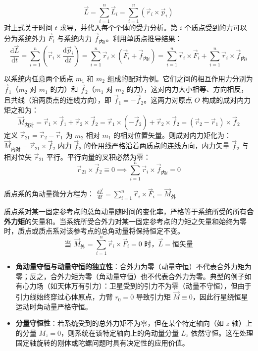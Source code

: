 \[
\vec{L} = \sum_{i=1}^{n} \vec{L}_i = \sum_{i=1}^{n} (\vec{r}_i \times \vec{p}_i)
\]
对上式关于时间 $t$ 求导，并代入每个个体的受力分析。第 $i$ 个质点受到的力可以分为系统外力 $\vec{F}_i$ 与系统内力 $\vec{f}_{\text{内}i}$。利用单质点推导结果：
\[
\frac{\mathrm{d}\vec{L}}{\mathrm{d}t} = \sum_{i=1}^{n} \left( \vec{r}_i \times \frac{\mathrm{d}\vec{p}_i}{\mathrm{d}t} \right) = \sum_{i=1}^{n} \vec{r}_i \times (\vec{F}_i + \vec{f}_{\text{内}i}) = \sum_{i=1}^{n} \vec{r}_i \times \vec{F}_i + \sum_{i=1}^{n} \vec{r}_i \times \vec{f}_{\text{内}i}
\]
\begin{note}
以系统内任意两个质点 $m_1$ 和 $m_2$ 组成的配对为例。它们之间的相互作用力分别为 $\vec{f}_1$（$m_2$ 对 $m_1$ 的力）和 $\vec{f}_2$（$m_1$ 对 $m_2$ 的力），这对内力大小相等、方向相反，且共线（沿两质点的连线方向），即 $\vec{f}_1 = -\vec{f}_2$。这两力对原点 $O$ 构成的成对内力矩之和为：
\[
\vec{M}_{\text{内对}} = \vec{r}_1 \times \vec{f}_1 + \vec{r}_2 \times \vec{f}_2 = \vec{r}_1 \times (-\vec{f}_2) + \vec{r}_2 \times \vec{f}_2 = (\vec{r}_2 - \vec{r}_1) \times \vec{f}_2
\]
定义 $\vec{r}_{21} = \vec{r}_2 - \vec{r}_1$ 为 $m_2$ 相对 $m_1$ 的相对位置矢量。则成对内力矩化为：
 \(\vec{M}_{\text{内对}} = \vec{r}_{21} \times \vec{f}_2\) 
内力 $\vec{f}_2$ 的作用线严格沿着两质点的连线方向，内力矢量 $\vec{f}_2$ 与相对位矢 $\vec{r}_{21}$ 平行。平行向量的叉积必然为零：
\[
\vec{r}_{21} \times \vec{f}_2 \equiv 0 \implies \sum_{i=1}^{n} \vec{r}_i \times \vec{f}_{\text{内}i} = 0
\]
\end{note}
质点系的角动量微分方程为：
 \(\frac{\mathrm{d}\vec{L}}{\mathrm{d}t} = \sum_{i=1}^{n} \vec{r}_i \times \vec{F}_i = \vec{M}_{\text{外}}\) 

\begin{theorem}[质点系角动量定理与角动量守恒]
 质点系对某一固定参考点的总角动量随时间的变化率，严格等于系统所受的所有\textbf{合外力矩}的矢量和。当系统所受合外力对某一固定参考点的力矩之矢量和始终为零时，质点或质点系对该参考点的总角动量将保持恒定不变。
\[
\text{当 } \vec{M}_{\text{外}} = \sum_{i=1}^{n} \vec{r}_i \times \vec{F}_i = 0 \text{ 时，} \vec{L} = \text{恒矢量}
\]
\begin{itemize}
\item \textbf{角动量守恒与动量守恒的独立性}：合外力为零（动量守恒）不代表合外力矩为零；反之，合外力矩为零（角动量守恒）也不代表合外力为零。典型的例子如有心力场（如天体万有引力）：卫星受到的引力不为零（动量不守恒），但由于引力线始终穿过心体原点，力臂 $r_0=0$ 导致引力矩 $\vec{M} \equiv 0$，因此行星绕恒星运动时角动量严格守恒。
\item \textbf{分量守恒性}：若系统受到的总外力矩不为零，但在某个特定轴向（如 $z$ 轴）上的分量 $M_{z} = 0$，则系统在该特定轴向上的角动量分量 $L_z$ 依然守恒。这在处理固定轴旋转的刚体或陀螺问题时具有决定性的应用价值。
\end{itemize}
\end{theorem}

